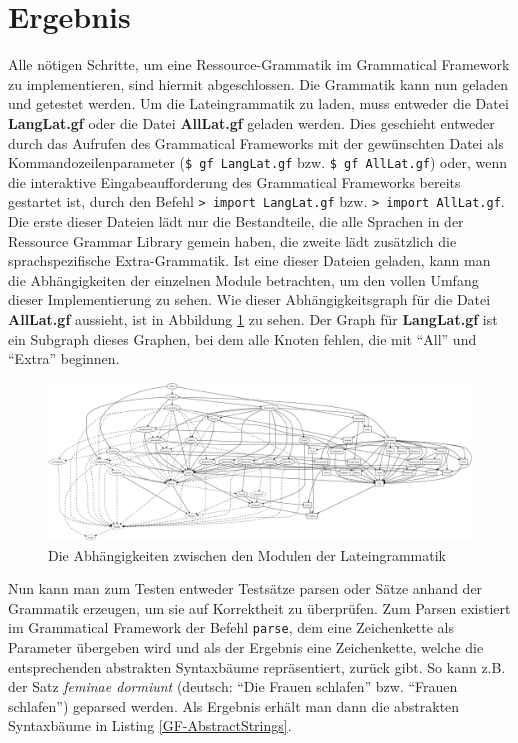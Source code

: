 \section{Ergebnis}
Alle nötigen Schritte, um eine Ressource-Grammatik im Grammatical Framework zu implementieren, sind hiermit abgeschlossen. Die Grammatik kann nun geladen und getestet werden. Um die Lateingrammatik zu laden, muss entweder die Datei \textbf{LangLat.gf} oder die Datei \textbf{AllLat.gf} geladen werden. Dies geschieht entweder durch das Aufrufen des Grammatical Frameworks mit der gewünschten Datei als Kommandozeilenparameter (\texttt{\$ gf LangLat.gf} bzw. \texttt{\$ gf AllLat.gf}) oder, wenn die interaktive Eingabeaufforderung des Grammatical Frameworks bereits gestartet ist, durch den Befehl \texttt{> import LangLat.gf} bzw. \texttt{> import AllLat.gf}. Die erste dieser Dateien lädt nur die Bestandteile, die alle Sprachen in der Ressource Grammar Library gemein haben, die zweite lädt zusätzlich die sprachspezifische Extra-Grammatik. Ist eine dieser Dateien geladen, kann man die Abhängigkeiten der einzelnen Module betrachten, um den vollen Umfang dieser Implementierung zu sehen. Wie dieser Abhängigkeitsgraph für die Datei \textbf{AllLat.gf} aussieht, ist in Abbildung \ref{GF-DepGraph} zu sehen. Der Graph für \textbf{LangLat.gf} ist ein Subgraph dieses Graphen, bei dem alle Knoten fehlen, die mit ``All'' und ``Extra'' beginnen. \par
\begin{figure}
\includegraphics[scale=0.25]{graphics/LatinDependencyGraph.eps}
\caption{Die Abhängigkeiten zwischen den Modulen der Lateingrammatik}\label{GF-DepGraph}
\end{figure}
Nun kann man zum Testen entweder Testsätze parsen oder Sätze anhand der Grammatik erzeugen, um sie auf Korrektheit zu überprüfen. Zum Parsen existiert im Grammatical Framework der Befehl \texttt{parse}, dem eine Zeichenkette als Parameter übergeben wird und als der Ergebnis eine Zeichenkette, welche die entsprechenden abstrakten Syntaxbäume repräsentiert, zurück gibt. So kann z.B. der Satz \textit{feminae dormiunt} (deutsch: ``Die Frauen schlafen'' bzw. ``Frauen schlafen'') geparsed werden. Als Ergebnis erhält man dann die abstrakten Syntaxbäume in Listing \ref{GF-AbstractStrings}. 
